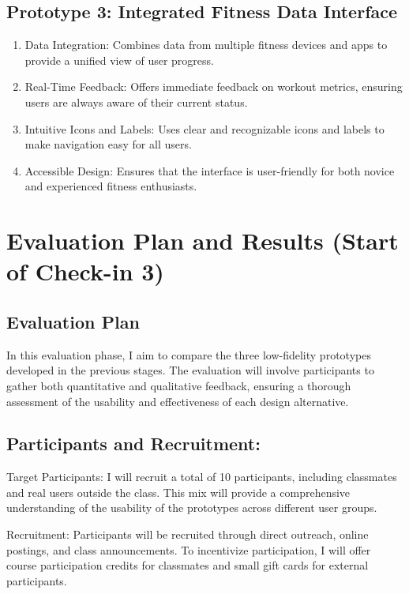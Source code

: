 \documentclass[
	letterpaper, %
]{jdf}
\begin{document}
\subsection{Prototype 3: Integrated Fitness Data Interface}
\begin{enumerate}
        \item Data Integration: Combines data from multiple fitness devices and apps to provide a unified view of user progress.
        \item Real-Time Feedback: Offers immediate feedback on workout metrics, ensuring users are always aware of their current status.
        \item Intuitive Icons and Labels: Uses clear and recognizable icons and labels to make navigation easy for all users.
        \item Accessible Design: Ensures that the interface is user-friendly for both novice and experienced fitness enthusiasts.
\end{enumerate}



\newpage

\section{Evaluation Plan and Results (Start of Check-in 3)}
\subsection{Evaluation Plan}
In this evaluation phase, I aim to compare the three low-fidelity prototypes developed in the previous stages. The evaluation will involve participants to gather both quantitative and qualitative feedback, ensuring a thorough assessment of the usability and effectiveness of each design alternative.

\subsection{Participants and Recruitment:}
Target Participants: I will recruit a total of 10 participants, including classmates and real users outside the class. This mix will provide a comprehensive understanding of the usability of the prototypes across different user groups.

Recruitment: Participants will be recruited through direct outreach, online postings, and class announcements. To incentivize participation, I will offer course participation credits for classmates and small gift cards for external participants.
\end{document}
